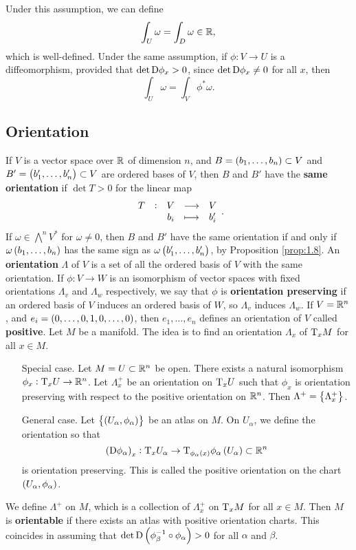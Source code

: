 \begin{fact*}
Under this assumption, we can define
$$ \int_U \omega = \int_D \omega \in \mathbb{R}, $$
which is well-defined. Under the same assumption, if $ \phi : V \to U $ is a diffeomorphism, provided that $ \det \mathrm{D}\phi_x > 0 $, since $ \det \mathrm{D}\phi_x \ne 0 $ for all $ x $, then
$$ \int_U \omega = \int_V \phi^*\omega. $$
\end{fact*}

\pagebreak

\subsection{Orientation}

If $ V $ is a vector space over $ \mathbb{R} $ of dimension $ n $, and $ B = \br{b_1, \dots, b_n} \subset V $ and $ B' = \br{b_1', \dots, b_n'} \subset V $ are ordered bases of $ V $, then $ B $ and $ B' $ have the \textbf{same orientation} if $ \det T > 0 $ for the linear map
$$ \function[T]{V}{V}{b_i}{b_i'}. $$
If $ \omega \in \bigwedge^nV^* $ for $ \omega \ne 0 $, then $ B $ and $ B' $ have the same orientation if and only if $ \omega\br{b_1, \dots, b_n} $ has the same sign as $ \omega\br{b_1', \dots, b_n'} $, by Proposition \ref{prop:1.8}. An \textbf{orientation} $ \Lambda $ of $ V $ is a set of all the ordered basis of $ V $ with the same orientation. If $ \phi : V \to W $ is an isomorphism of vector spaces with fixed orientations $ \Lambda_v $ and $ \Lambda_w $ respectively, we say that $ \phi $ is \textbf{orientation preserving} if an ordered basis of $ V $ induces an ordered basis of $ W $, so $ \Lambda_v $ induces $ \Lambda_w $. If $ V = \mathbb{R}^n $, and $ e_i = \br{0, \dots, 0, 1, 0, \dots, 0} $, then $ e_1, \dots, e_n $ defines an orientation of $ V $ called \textbf{positive}. Let $ M $ be a manifold. The idea is to find an orientation $ \Lambda_x $ of $ \mathrm{T}_xM $ for all $ x \in M $.
\begin{itemize}[leftmargin=1in]
\item[Special case.] Let $ M = U \subset \mathbb{R}^n $ be open. There exists a natural isomorphism $ \phi_x : \mathrm{T}_xU \to \mathbb{R}^n $. Let $ \Lambda_x^+ $ be an orientation on $ \mathrm{T}_xU $ such that $ \phi_x $ is orientation preserving with respect to the positive orientation on $ \mathbb{R}^n $. Then $ \Lambda^+ = \cbr{\Lambda_x^+} $.
\item[General case.] Let $ \cbr{\br{U_\alpha, \phi_\alpha}} $ be an atlas on $ M $. On $ U_\alpha $, we define the orientation so that
$$ \br{\D\phi_\alpha}_x : \T_xU_\alpha \to \T_{\phi_\alpha\br{x}}\phi_\alpha\br{U_\alpha} \subset \RR^n $$
is orientation preserving. This is called the positive orientation on the chart $ \br{U_\alpha, \phi_\alpha} $.
\end{itemize}
We define $ \Lambda^+ $ on $ M $, which is a collection of $ \Lambda_x^+ $ on $ \mathrm{T}_xM $ for all $ x \in M $. Then $ M $ is \textbf{orientable} if there exists an atlas with positive orientation charts. This coincides in assuming that $ \det \D\br{\phi_\beta^{-1} \circ \phi_\alpha} > 0 $ for all $ \alpha $ and $ \beta $.

